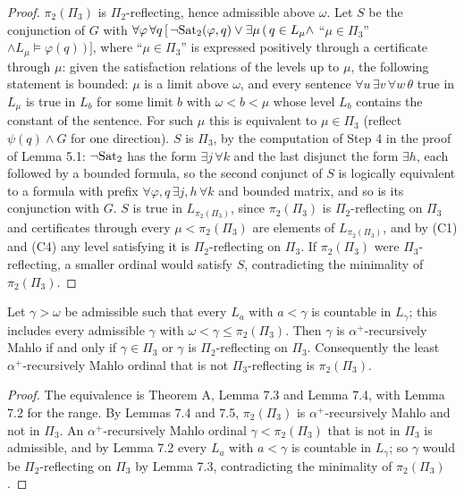 \documentclass[11pt]{article}
\begin{document}
\begin{proof}
$\pi_2(\Pi_3)$ is $\Pi_2$-reflecting, hence admissible above $\omega$. Let $S$ be the conjunction of $G$ with
$\forall\varphi\, \forall q\, [\, \neg\mathrm{Sat}_2(\varphi, q) \vee \exists\mu\, (\, q \in L_{\mu} \wedge$ ``$\mu \in \Pi_3$''
$\wedge L_{\mu} \models \varphi(q)\, )\, ]$, where ``$\mu \in \Pi_3$'' is expressed positively through a certificate through
$\mu$: given the satisfaction relations of the levels up to $\mu$, the following statement is bounded: $\mu$ is a
limit above $\omega$, and every sentence $\forall u\, \exists v\, \forall w\, \theta$ true in $L_{\mu}$ is true in
$L_b$ for some limit $b$ with $\omega < b < \mu$ whose level $L_b$ contains the constant of the sentence. For such $\mu$ this is equivalent to $\mu \in \Pi_3$ (reflect
$\psi(q) \wedge G$ for one direction). $S$ is $\Pi_3$, by the computation of Step 4 in the proof of Lemma 5.1:
$\neg\mathrm{Sat}_2$ has the form $\exists j\, \forall k$ and the last disjunct the form $\exists h$, each followed by a
bounded formula, so the second conjunct of $S$ is logically equivalent to a formula with prefix
$\forall \varphi, q\, \exists j, h\, \forall k$ and bounded matrix, and so is its conjunction with $G$. $S$ is true
in $L_{\pi_2(\Pi_3)}$, since $\pi_2(\Pi_3)$ is $\Pi_2$-reflecting on $\Pi_3$ and certificates through every $\mu < \pi_2(\Pi_3)$ are
elements of $L_{\pi_2(\Pi_3)}$, and by (C1) and (C4) any level satisfying it is $\Pi_2$-reflecting on $\Pi_3$. If $\pi_2(\Pi_3)$
were $\Pi_3$-reflecting, a smaller ordinal would satisfy $S$, contradicting the minimality of $\pi_2(\Pi_3)$.
\end{proof}

\begin{statement} Let $\gamma > \omega$ be admissible such that every $L_a$ with $a < \gamma$ is countable in $L_{\gamma}$; this
includes every admissible $\gamma$ with $\omega < \gamma \le \pi_2(\Pi_3)$. Then $\gamma$ is $\alpha^+$-recursively Mahlo if and only if
$\gamma \in \Pi_3$ or $\gamma$ is $\Pi_2$-reflecting on $\Pi_3$. Consequently the least $\alpha^+$-recursively Mahlo ordinal that is not
$\Pi_3$-reflecting is $\pi_2(\Pi_3)$.
\end{statement}

\begin{proof}
The equivalence is Theorem A, Lemma 7.3 and Lemma 7.4, with Lemma 7.2 for the range. By Lemmas 7.4 and 7.5,
$\pi_2(\Pi_3)$ is $\alpha^+$-recursively Mahlo and not in $\Pi_3$. An $\alpha^+$-recursively Mahlo ordinal $\gamma < \pi_2(\Pi_3)$ that is not in $\Pi_3$ is admissible, and by Lemma 7.2 every $L_a$ with
$a < \gamma$ is countable in $L_{\gamma}$; so $\gamma$ would be $\Pi_2$-reflecting on $\Pi_3$ by Lemma 7.3, contradicting
the minimality of $\pi_2(\Pi_3)$.
\end{proof}
\end{document}
